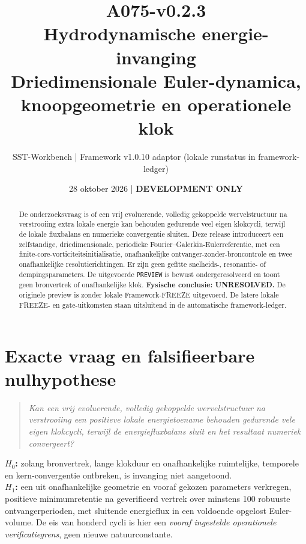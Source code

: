 \documentclass[10pt,a4paper]{article}
\title{\textcolor{main}{A075-v0.2.3}\\Hydrodynamische energie-invanging\\\large Driedimensionale Euler-dynamica, knoopgeometrie en operationele klok}
\author{SST-Workbench | Framework v1.0.10 adaptor (lokale runstatus in framework-ledger)}
\date{28 oktober 2026 | \textbf{DEVELOPMENT ONLY}}
\begin{document}
\maketitle
\begin{abstract}
De onderzoeksvraag is of een vrij evoluerende, volledig gekoppelde wervelstructuur na verstrooiing extra lokale energie kan behouden gedurende veel eigen klokcycli, terwijl de lokale fluxbalans en numerieke convergentie sluiten. Deze release introduceert een zelfstandige, driedimensionale, periodieke Fourier--Galerkin-Eulerreferentie, met een finite-core-vorticiteitsinitialisatie, onafhankelijke ontvanger-zonder-broncontrole en twee onafhankelijke resolutierichtingen. Er zijn geen gefitte snelheids-, resonantie- of dempingsparameters. De uitgevoerde \texttt{PREVIEW} is bewust ondergeresolveerd en toont geen bronvertrek of onafhankelijke klok. \textbf{Fysische conclusie: UNRESOLVED.} De originele preview is zonder lokale Framework-FREEZE uitgevoerd. De latere lokale FREEZE- en gate-uitkomsten staan uitsluitend in de automatische framework-ledger.
\end{abstract}
\section{Exacte vraag en falsifieerbare nulhypothese}
\begin{quote}\emph{Kan een vrij evoluerende, volledig gekoppelde wervelstructuur na verstrooiing een positieve lokale energietoename behouden gedurende vele eigen klokcycli, terwijl de energiefluxbalans sluit en het resultaat numeriek convergeert?}\end{quote}
\textbf{$H_0$:} zolang bronvertrek, lange klokduur en onafhankelijke ruimtelijke, temporele en kern-convergentie ontbreken, is invanging niet aangetoond.\\
\textbf{$H_1$:} een uit onafhankelijke geometrie en vooraf gekozen parameters verkregen, positieve minimumretentie na geverifieerd vertrek over minstens 100 robuuste ontvangerperioden, met sluitende energieflux in een voldoende opgelost Euler-volume.
De eis van honderd cycli is hier een \emph{vooraf ingestelde operationele verificatiegrens}, geen nieuwe natuurconstante.
\end{document}
